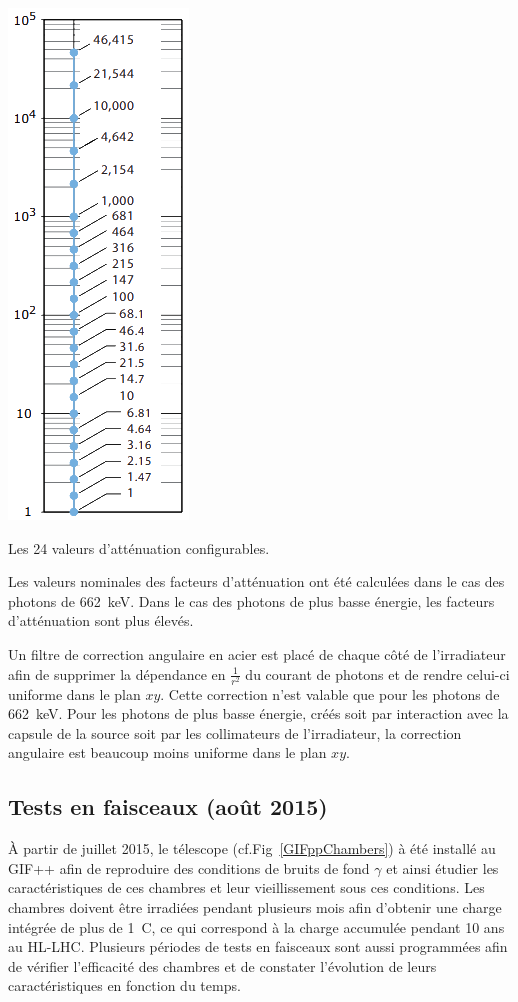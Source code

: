\marginpar
{
	\centering
	\includegraphics[width=1.0\marginparwidth]{GLA/ValueAttenuateur.png}
	\captionsetup{type=figure}\caption{Les \num{24} valeurs d'atténuation configurables.}
	\label{ValueAttenuateur}
}

Les valeurs nominales des facteurs d'atténuation ont été calculées dans le cas des photons de \SI{662}{\kilo\eV}. Dans le cas des photons de plus basse énergie, les facteurs d'atténuation sont plus élevés. 

Un filtre de correction angulaire en acier est placé de chaque côté de l'irradiateur afin de supprimer la dépendance en $\frac{1}{r^2}$ du courant de photons et de rendre celui-ci uniforme dans le plan $xy$. Cette correction n'est valable que pour les photons de \SI{662}{\kilo\eV}. Pour les photons de plus basse énergie, créés soit par interaction avec la capsule de la source soit par les collimateurs de l'irradiateur, la correction angulaire est beaucoup moins uniforme dans le plan $xy$.

\subsection{Tests en faisceaux (août 2015)}
\label{GIFFF}
À partir de juillet \num{2015}, le télescope (cf.Fig~\ref{GIFppChambers}) à été installé au GIF++ afin de reproduire des conditions de bruits de fond $\gamma$ et ainsi étudier les caractéristiques de ces chambres et leur vieillissement sous ces conditions. Les chambres doivent être irradiées pendant plusieurs mois afin d'obtenir une charge intégrée de plus de \SI{1}{\coulomb}, ce qui correspond à la charge accumulée pendant \num{10} ans au HL-LHC.
Plusieurs périodes de tests en faisceaux sont aussi programmées afin de vérifier l'efficacité des chambres et de constater l'évolution de leurs caractéristiques en fonction du temps. %

